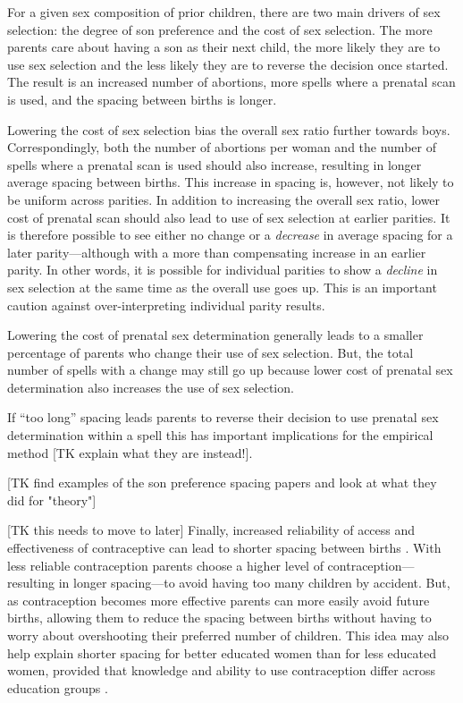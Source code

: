 \documentclass[12pt,letterpaper]{article}
\begin{document}
For a given sex composition of prior children, there are two main drivers 
of sex selection: the degree of son preference and the cost of sex selection.
The more parents care about having a son as their next child, the more
likely they are to use sex selection and the less likely they are to
reverse the decision once started.
The result is an increased number of abortions, more spells where a
prenatal scan is used, and the spacing between births is longer.

Lowering the cost of sex selection bias the overall sex ratio further 
towards boys.
Correspondingly, both the number of abortions per woman and the
number of spells where a prenatal scan is used should also increase,
resulting in longer average spacing between births.
This increase in spacing is, however, not likely to be uniform across parities.
In addition to increasing the overall sex ratio, lower cost of prenatal 
scan should also lead to use of sex selection at earlier parities.
It is therefore possible to see either no change or a \emph{decrease} 
in average spacing for a later parity---although with a more than compensating 
increase in an earlier parity.
In other words, it is possible for individual parities to show a \emph{decline}
in sex selection at the same time as the overall use goes up.
This is an important caution against over-interpreting individual 
parity results.


Lowering the cost of prenatal sex determination generally leads to 
a smaller percentage of parents who change their use of sex selection.
But, the total number of spells with a change may still
go up because lower cost of prenatal sex determination also
increases the use of sex selection.



If ``too long'' spacing leads parents to reverse their decision to use
prenatal sex determination within a spell this has important implications 
for the empirical method [TK explain what they are instead!].






[TK find examples of the son preference spacing papers and look at what they did
for "theory"]


[TK this needs to move to later]
Finally, increased reliability of access and effectiveness of
contraceptive can lead to shorter spacing between births 
\citep{Keyfitz1971,Heckman1976}.
With less reliable contraception parents choose a higher level of 
contraception---resulting in longer spacing---to avoid having 
too many children by accident.
But, as contraception becomes more effective parents can more
easily avoid future births, allowing them to reduce the spacing 
between births without having to worry about overshooting their 
preferred number of children.
This idea may also help explain shorter spacing for better 
educated women than for less educated women, provided that   
knowledge and ability to use contraception differ
across education groups \citep{Tulasidhar1993,Whitworth2002}.
\end{document}
